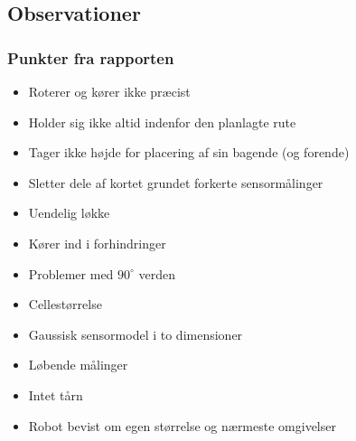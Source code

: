 \subsection{Observationer}

\begin{frame}
\frametitle{Punkter fra rapporten}
\begin{itemize}
\item Roterer og kører ikke præcist
\item Holder sig ikke altid indenfor den planlagte rute
\item Tager ikke højde for placering af sin bagende (og forende)
\item Sletter dele af kortet grundet forkerte sensormålinger
\item Uendelig løkke
\item Kører ind i forhindringer
\item Problemer med $90^\circ$ verden
\item Cellestørrelse
\item Gaussisk sensormodel i to dimensioner
\item Løbende målinger
\item Intet tårn
\item Robot bevist om egen størrelse og nærmeste omgivelser
\end{itemize}
\end{frame}